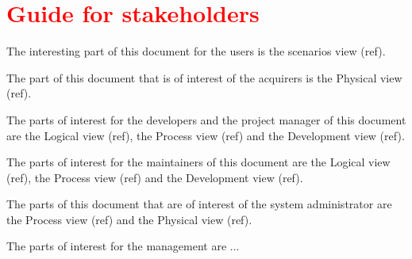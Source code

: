 \section{\textcolor{red}{Guide for stakeholders}}

The interesting part of this document for the users is the
scenarios view (ref).

The part of this document that is of interest of the acquirers is
the Physical view (ref).

The parts of interest for the developers and the project manager
of this document are the Logical view (ref), the Process view
(ref) and the Development view (ref).

The parts of interest for the maintainers of this document are the
Logical view (ref), the Process view (ref) and the Development
view (ref).

The parts of this document that are of interest of the system
administrator are the Process view (ref) and the Physical view
(ref).

The parts of interest for the management are ...
